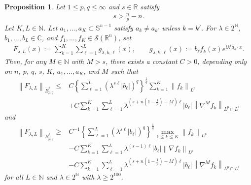 \documentclass[a4paper,12pt,reqno]{amsart}
\theoremstyle{plain}
\newtheorem{prop}[thm]{Proposition}
\theoremstyle{definition}
\newcommand{\dB}{\dot{B}}
\renewcommand{\leq}{\leqslant}
\renewcommand{\geq}{\geqslant}
\newcommand{\n}[1]{{\left\|#1\right\|}}
\newcommand{\R}{\mathbb{R}}
\newcommand{\N}{\mathbb{N}}
\newcommand{\C}{\mathbb{C}}
\newcommand{\Mp}[1]{\left\{#1\right\}}
\renewcommand{\sp}[1]{\left(#1\right)}
\begin{document}
\begin{prop}\label{prop:F-Besov}
    Let $1 \leq p,q \leq \infty$ and $s \in \R$ satisfy
    \begin{align}
        s>\frac{n}{p}-n.
    \end{align}
    Let $K,L \in \N$.
    Let $a_1,\dots,a_K \subset \mathbb{S}^{n-1}$ satisfy $a_k \neq a_{k'}$ unless $k=k'$.  
    For $\lambda \in 2^{\N}$, $b_1,\dots,b_L \in \C$, and $f_1,\dots,f_K \in \mathscr{S}(\R^n)$,
    set
    \begin{align}\label{df:F}
        F_{\lambda,L}(x)
        :=
        \sum_{k=1}^K
        \sum_{\ell=1}^L
        g_{\lambda,k,\ell}(x),
        \qquad
        g_{\lambda,k,\ell}(x):=b_{\ell}f_k(x)e^{i\lambda^\ell a_k\cdot x}.
    \end{align}
    Then, for any $M \in \N$ with $M > s$, there exists a constant $C>0$, depending only on $n$, $p$, $q$, $s$, $K$, $a_1,\dots,a_K$, and $M$ such that
    \begin{align}
        \n{F_{\lambda,L}}_{\dB_{p,q}^s}
        \leq{}
        &
        C\Mp{\sum_{\ell=1}^L\sp{\lambda^{s\ell}|b_{\ell}|}^q}^{\frac{1}{q}}
        \sum_{k=1}^K\n{f_k}_{L^p}
        \\
        &
        +
        C
        \sum_{k=1}^K
        \sum_{\ell=1}^L
        \lambda^{(s+n(1-\frac{1}{p})-M)\ell}
        |b_{\ell}|
        \n{\nabla^Mf_k}_{L^p\cap L^1}
        \label{est:upper-F}
    \end{align}
    and
    \begin{align}
        \n{F_{\lambda,L}}_{\dB_{p,q}^s}
        \geq{}
        &
        C^{-1}
        \Mp{\sum_{\ell=1}^L\sp{\lambda^{s\ell}|b_{\ell}|}^q}^{\frac{1}{q}}
        \max_{1 \leq k \leq K}\n{f_k}_{L^p}
        \\
        &
        -
        C
        \sum_{k=1}^K
        \sum_{\ell=1}^L
        \lambda^{(s-1)\ell}
        |b_{\ell}|
        \n{\nabla f_k}_{L^p}
        \\
        &
        -
        C
        \sum_{k=1}^K
        \sum_{\ell=1}^L
        \lambda^{(s+n(1-\frac{1}{p})-M)\ell}
        |b_{\ell}|
        \n{\nabla^Mf_k}_{L^p\cap L^1}
        \label{est:lower-F}
    \end{align}
    for all $L \in \N$ and $\lambda \in 2^{\N}$ with $\lambda\geq 2^{100}$.
\end{prop}
\end{document}
